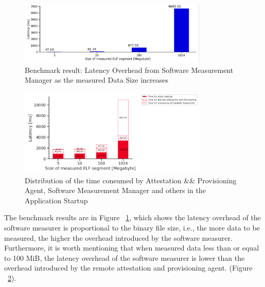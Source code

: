 \begin{figure}[H]
    \centering
    \includegraphics[width=0.8\textwidth]{images/overhead_software_measurement_manager_as_elf_size_increasing.PNG}
    \caption[Benchmark result: Latency Overhead from Software Measurement Manager as the measured Data Size increases]{Benchmark result: Latency Overhead from Software Measurement Manager as the measured Data Size increases}
    \label{fig:overhead_software_measurement_manager_as_elf_size_increasing}
\end{figure}

\begin{figure}[H]
    \centering
    \includegraphics[width=0.8\textwidth]{images/startup_time_change_as_elf_size_increasing.PNG}
    \caption[Distribution of the time consumed by Attestation \&\& Provisioning Agent, Software Measurement Manager and others in the Application Startup]{Distribution of the time consumed by Attestation \&\& Provisioning Agent, Software Measurement Manager and others in the Application Startup}
    \label{fig:startup_time_change_as_elf_size_increasing}
\end{figure}



The benchmark results are in Figure ~\ref{fig:overhead_software_measurement_manager_as_elf_size_increasing}, which shows the latency overhead of the software measurer is proportional to the binary file size, i.e., the more data to be measured, the higher the overhead introduced by the 
software measurer. Furthermore, it is worth mentioning that when measured data less than or equal to 100 MiB, the latency overhead of the software measurer is lower than the overhead introduced by the remote attestation and provisioning agent. 
(Figure ~\ref{fig:startup_time_change_as_elf_size_increasing}).



